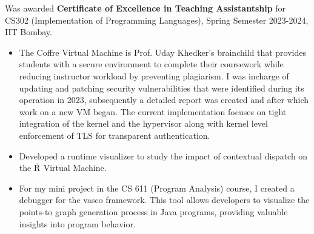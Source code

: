 \documentclass[10pt,a4paper,ragged2e]{altacv}
\newcommand{\rsh}[1]{\ensuremath{\textrm{Ř}_{#1}}}
\begin{document}
Was awarded \textbf{Certificate of Excellence in Teaching Assistantship} for CS302 (Implementation of Programming Languages), Spring Semester 2023-2024, IIT Bombay.
\smallskip




\clearpage


\begin{itemize}
\item The Coffre Virtual Machine is Prof. Uday Khedker's brainchild that provides students with a secure environment to complete their coursework while reducing instructor workload by preventing plagiarism. I was incharge of updating and patching security vulnerabilities that were identified during its operation in 2023, subsequently a detailed report was created and after which work on a new VM began. The current implementation focuses on tight integration of the kernel and the hypervisor along with kernel level enforcement of TLS for transparent authentication.
\end{itemize}

\begin{itemize}
\item Developed a runtime visualizer to study the impact of contextual dispatch on the \rsh{} Virtual Machine.
\end{itemize}

\begin{itemize}
\item For my mini project in the CS 611 (Program Analysis) course, I created a debugger for the vasco framework. This tool allows developers to visualize the points-to graph generation process in Java programs, providing valuable insights into program behavior.
\end{itemize}
\end{document}
